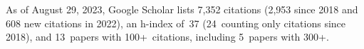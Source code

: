 %
As of August 29, 2023, Google Scholar lists
7,352 citations (2,953 since 2018 and 608 new citations in 2022),
an h-index of~37 (24~counting only citations since 2018),
and 13~papers with 100+~citations, including 5~papers with 300+.
